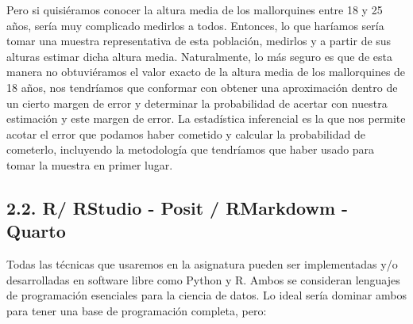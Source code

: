 \documentclass[
  letterpaper,
  DIV=11,
  numbers=noendperiod]{scrreprt}
\begin{document}
Pero si quisiéramos conocer la altura media de los mallorquines entre 18
y 25 años, sería muy complicado medirlos a todos. Entonces, lo que
haríamos sería tomar una muestra representativa de esta población,
medirlos y a partir de sus alturas estimar dicha altura media.
Naturalmente, lo más seguro es que de esta manera no obtuviéramos el
valor exacto de la altura media de los mallorquines de 18 años, nos
tendríamos que conformar con obtener una aproximación dentro de un
cierto margen de error y determinar la probabilidad de acertar con
nuestra estimación y este margen de error. La estadística inferencial es
la que nos permite acotar el error que podamos haber cometido y calcular
la probabilidad de cometerlo, incluyendo la metodología que tendríamos
que haber usado para tomar la muestra en primer lugar.

\hypertarget{r-rstudio---posit-rmarkdowm---quarto}{%
\subsection{2.2. R/ RStudio - Posit / RMarkdowm -
Quarto}\label{r-rstudio---posit-rmarkdowm---quarto}}

Todas las técnicas que usaremos en la asignatura pueden ser
implementadas y/o desarrolladas en software libre como Python y R. Ambos
se consideran lenguajes de programación esenciales para la ciencia de
datos. Lo ideal sería dominar ambos para tener una base de programación
completa, pero:
\end{document}
